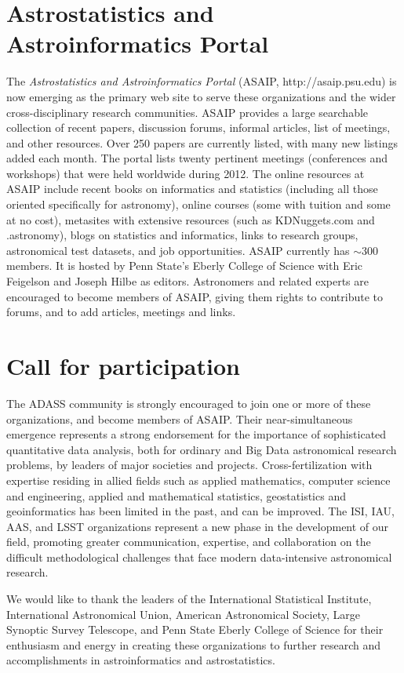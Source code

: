 \section{Astrostatistics and Astroinformatics Portal}

The {\it Astrostatistics and Astroinformatics Portal} (ASAIP, http://asaip.psu.edu) is now emerging as the primary web site to serve these organizations and the wider cross-disciplinary research communities.  ASAIP provides a large searchable collection of recent papers, discussion forums, informal articles, list of meetings, and other resources.  Over 250 papers are currently listed, with many new listings added each month.  The portal lists twenty pertinent meetings (conferences and workshops) that were held worldwide during 2012.  The online resources at ASAIP include recent books on informatics and statistics (including all those oriented specifically for astronomy), online courses (some with tuition and some at no cost), metasites with extensive resources (such as KDNuggets.com and .astronomy), blogs on statistics and informatics, links to research groups, astronomical test datasets, and job opportunities.  ASAIP currently has $\sim$300 members.  It is hosted by Penn State's Eberly College of Science with Eric Feigelson and Joseph Hilbe as editors.  Astronomers and related experts are encouraged to become members of ASAIP, giving them rights to contribute to forums, and to add articles, meetings and links.   

\section{Call for participation}

The ADASS community is strongly encouraged to join one or more of these organizations, and become members of ASAIP.  Their near-simultaneous emergence represents a strong endorsement for the importance of sophisticated quantitative data analysis, both for ordinary and Big Data astronomical research problems, by leaders of major  societies and projects.    Cross-fertilization with expertise residing in allied fields such as applied mathematics, computer science and engineering, applied and mathematical statistics, geostatistics and geoinformatics has been limited in the past, and can be improved. The ISI, IAU, AAS, and LSST organizations represent a new phase in the development of our field, promoting greater communication, expertise, and collaboration on the difficult methodological challenges that face modern data-intensive astronomical research.

\bigskip

\acknowledgements We would like to thank the leaders of the International Statistical Institute, International Astronomical Union, American Astronomical Society, Large Synoptic Survey Telescope, and Penn State Eberly College of Science for their enthusiasm and energy in creating these organizations to further research and accomplishments in astroinformatics and astrostatistics. 




